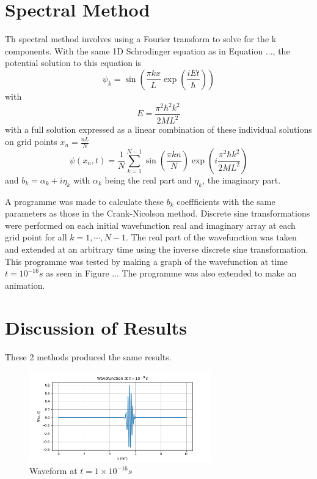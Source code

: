 \documentclass[11pt]{article}
\begin{document}
	\section{Spectral Method}
	Th spectral method involves using a Fourier transform to solve for the k components. With the same 1D Schrodinger equation as in Equation ..., the potential solution to this equation is 
	\begin{equation}
		\psi_{k} =  \sin (\frac{\pi k x}{L} \exp(\frac{iEt}{\hbar}))
		\label{eq9}
	\end{equation}
	with 
	\begin{equation}
		E = \frac{\pi^{2} \hbar^{2} k^{2}}{2ML^{2}}
		\label{eq10}
	\end{equation}
	with a full solution expressed as a linear combination of these individual solutions on grid points $x_{n} = \frac{nL}{N}$
	\begin{equation}
		\psi(x_{n}, t) = \frac{1}{N} \sum_{k = 1}^{N-1} \sin(\frac{\pi k n}{N}) \exp(i\frac{\pi^{2} \hbar k^{2}}{2ML^{2}})
		\label{eq11}
	\end{equation}
	and $b_{k} = \alpha_{k} + i\eta_{k}$ with $\alpha_{k}$ being the real part and $\eta_{k}$, the imaginary part.
	
	A programme was made to calculate these $b_{k}$ coeffficients with the same parameters as those in the Crank-Nicolson method. Discrete sine transformations were performed on each initial wavefunction real and imaginary array at each grid point for all $k=1, \cdots, N-1$.
	The real part of the wavefunction was taken and extended at an arbitrary time using the inverse discrete sine transformation. This programme was tested by making a graph of the wavefunction at time $t = 10^{-16} s$ as seen in Figure ...  The programme was also extended to make an animation. 
	
	
	 
	\section{Discussion of Results}
	These 2 methods produced the same results.
		 
	\begin{figure}[!h]\begin{center} 
			\vspace{12pt}
			\includegraphics[width=0.7\textwidth]{spectral_test_time.png}
			\caption{Waveform at $ t = 1 \times 10^{-16} s $}
			\label{fig:spectral_test} 
		\end{center}
	\end{figure} 
\end{document}
